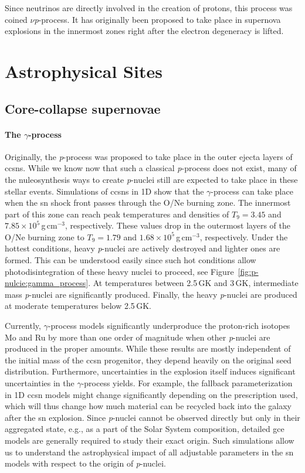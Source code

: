 Since neutrinos are directly involved in the creation of protons, this process was coined $\nu$\textit{p}-process. It has originally been proposed to take place in supernova explosions in the innermost zones right after the electron degeneracy is lifted.



\section{Astrophysical Sites}

\subsection{Core-collapse supernovae}

\paragraph{The $\gamma$-process}
Originally, the \textit{p}-process was proposed to take place in the outer ejecta layers of \acfp{ccsn}. While we know now that such a classical \textit{p}-process does not exist, many of the nuleosynthesis ways to create \textit{p}-nuclei still are expected to take place in these stellar events. Simulations of \acp{ccsn} in 1D show that the $\gamma$-process can take place when the \ac{sn} shock front passes through the O/Ne burning zone. The innermost part of this zone can reach peak temperatures and densities of $T_9=3.45$ and $7.85\times10^5$\,g\,cm$^{-3}$, respectively. These values drop in the outermost layers of the O/Ne burning zone to $T_9=1.79$ and $1.68\times10^5$\,g\,cm$^{-3}$, respectively. Under the hottest conditions, heavy \textit{p}-nuclei are actively destroyed and lighter ones are formed. This can be understood easily since such hot conditions allow photodisintegration of these heavy nuclei to proceed, see Figure~\ref{fig:p-nulcie:gamma_process}. At temperatures between 2.5\,GK and 3\,GK, intermediate mass \textit{p}-nuclei are significantly produced. Finally, the heavy \textit{p}-nuclei are produced at moderate temperatures below 2.5\,GK. 

Currently, $\gamma$-process models significantly underproduce the proton-rich isotopes Mo and Ru by more than one order of magnitude when other \textit{p}-nuclei are produced in the proper amounts. While these results are mostly independent of the initial mass of the \ac{ccsn} progenitor, they depend heavily on the original seed distribution. Furthermore, uncertainties in the explosion itself induces significant uncertainties in the $\gamma$-process yields. For example, the fallback parameterization in 1D \ac{ccsn} models might change significantly depending on the prescription used, which will thus change how much material can be recycled back into the galaxy after the \ac{sn} explosion. Since \textit{p}-nuclei cannot be observed directly but only in their aggregated state, e.g., as a part of the Solar System composition, detailed \ac{gce} models are generally required to study their exact origin. Such simulations allow us to understand the astrophysical impact of all adjustable parameters in the \ac{sn} models with respect to the origin of \textit{p}-nuclei. 

